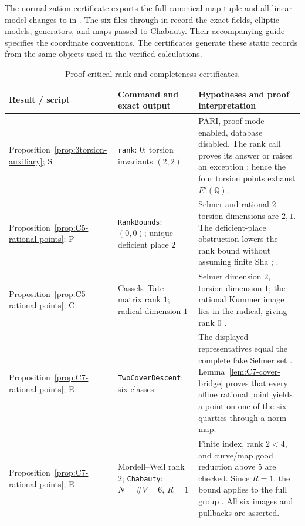 \documentclass[11pt,a4paper]{amsart}
\theoremstyle{definition}
\theoremstyle{remark}
\numberwithin{equation}{section}
\newcommand{\Q}{\mathbb{Q}}
\begin{document}
The normalization certificate exports the full canonical-map tuple and
all linear model changes to  in
. The six files
 through  in
record the exact fields, elliptic models, generators, and maps passed to
Chabauty. Their accompanying guide specifies the coordinate conventions.
The certificates generate these static records from the same objects
used in the verified calculations.

\begin{table}[htbp]
\caption{Proof-critical rank and completeness certificates.}
\label{tab:proof-audit}
\centering
\footnotesize
\setlength{\tabcolsep}{3pt}
\renewcommand{\arraystretch}{1.16}
\begin{tabular}{@{}>{\raggedright\arraybackslash}p{}>{\raggedright\arraybackslash}p{}>{\raggedright\arraybackslash}p{}@{}}
\hline
Result / script & Command and exact output & Hypotheses and proof interpretation \\
\hline
Proposition~\ref{prop:3torsion-auxiliary}; S
& \texttt{rank}: \(0\); torsion invariants \((2,2)\)
& PARI, proof mode enabled, database disabled. The rank call proves its
answer or raises an exception \cite{sageRankDocumentation}; hence the four
torsion points exhaust \(E'(\Q)\). \\[3pt]
Proposition~\ref{prop:C5-rational-points}; P
& \texttt{RankBounds}: \((0,0)\); unique deficient place \(2\)
& Selmer and rational \(2\)-torsion dimensions are \(2,1\). The
deficient-place obstruction lowers the rank bound without assuming finite
Sha \cite[Theorem~5 and Corollary~12]{poonenStollCasselsTate};
\cite{magmaHandbookJacobian}. \\[3pt]
Proposition~\ref{prop:C5-rational-points}; C
& Cassels--Tate matrix rank \(1\); radical dimension \(1\)
& Selmer dimension \(2\), torsion dimension \(1\); the rational Kummer
image lies in the radical, giving rank \(0\)
\cite[Section~3]{fisherYanCasselsTate}. \\[3pt]
Proposition~\ref{prop:C7-rational-points}; E
& \texttt{TwoCoverDescent}: six classes
& The displayed representatives equal the complete fake Selmer set
\cite{magmaHandbookTwoSelmer}. Lemma~\ref{lem:C7-cover-bridge} proves
that every affine rational point yields a point on one of the six
quartics through a norm map. \\[3pt]
Proposition~\ref{prop:C7-rational-points}; E
& Mordell--Weil rank \(2\); \texttt{Chabauty}: \(N=\#V=6\), \(R=1\)
& Finite index, rank \(2<4\), and curve/map good reduction above \(5\)
are checked. Since \(R=1\), the bound applies to the full group
\cite{magmaHandbookChabauty}. All six images and pullbacks are asserted. \\
\hline
\end{tabular}
\end{table}
\end{document}
